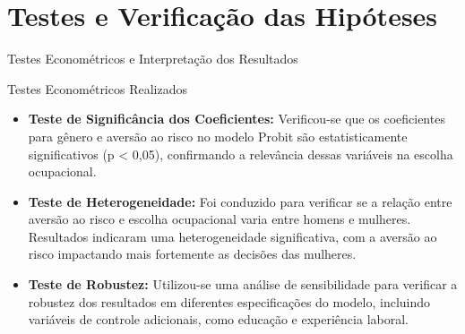 \documentclass[aspectratio=169, xcolor={dvipsnames}, 10pt, brazil]{beamer}
\begin{document}
\section{Testes e Verificação das Hipóteses}
\begin{frame}{Testes Econométricos e Interpretação dos Resultados}
    \begin{block}{Testes Econométricos Realizados}
        \begin{itemize}
            \item \textbf{Teste de Significância dos Coeficientes:} Verificou-se que os coeficientes para gênero e aversão ao risco no modelo Probit são estatisticamente significativos (p < 0,05), confirmando a relevância dessas variáveis na escolha ocupacional.
            \item \textbf{Teste de Heterogeneidade:} Foi conduzido para verificar se a relação entre aversão ao risco e escolha ocupacional varia entre homens e mulheres. Resultados indicaram uma heterogeneidade significativa, com a aversão ao risco impactando mais fortemente as decisões das mulheres.
            \item \textbf{Teste de Robustez:} Utilizou-se uma análise de sensibilidade para verificar a robustez dos resultados em diferentes especificações do modelo, incluindo variáveis de controle adicionais, como educação e experiência laboral.
        \end{itemize}
    \end{block}
\end{frame}
\end{document}
